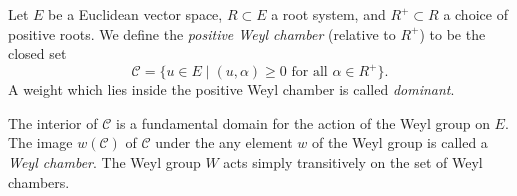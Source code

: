 \documentclass[12pt]{article}
\begin{document}

Let $E$ be a Euclidean vector space, $R\subset E$ a root system, and
$R^+\subset R$ a choice of positive roots.  We define the {\em
  positive Weyl chamber} (relative to $R^+$) to be the closed set
$$\mathcal{C}=\{u\in E\mid (u,\alpha)\geq 0\text{ for all }\alpha\in
R^+\}.$$
A weight which lies inside the positive Weyl chamber is
called {\em dominant}.

The interior of $\mathcal{C}$ is a fundamental domain for the action
of the Weyl group on $E$.  The image $w(\mathcal{C})$ of $\mathcal{C}$
under the any element $w$ of the Weyl group is called a {\em Weyl
  chamber}. The Weyl group $W$ acts simply transitively on the set of
Weyl chambers.
\end{document}
